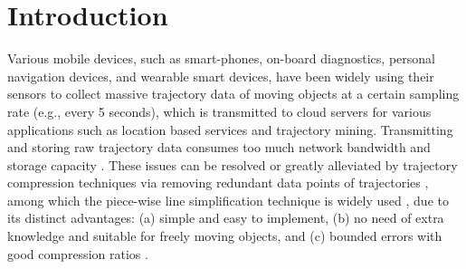 \section{Introduction}
\label{sec-intro}

Various mobile devices, such as smart-phones, on-board diagnostics, personal navigation devices, and wearable smart devices, have been widely using their sensors to collect massive trajectory data of moving objects at a certain sampling rate (e.g., every 5 seconds), which is transmitted to cloud servers for various applications such as location based services and trajectory mining.
%
Transmitting and storing raw trajectory data consumes too much network bandwidth and storage capacity \cite{Chen:Trajectory, Meratnia:Spatiotemporal, Liu:BQS, Muckell:Compression,Cao:Spatio, Popa:Spatio,Nibali:Trajic}. %
%
%
These issues can be resolved or greatly alleviated by trajectory compression techniques via removing redundant data points of trajectories \cite{Douglas:Peucker, Hershberger:Speeding, Meratnia:Spatiotemporal, Liu:BQS, Muckell:survey, Muckell:Compression, Chen:Trajectory, Cao:Spatio, Shi:Survey, Nibali:Trajic, Long:Direction, Popa:Spatio, Song:PRESS}, among which the piece-wise line {simplification} technique is widely used \cite{Douglas:Peucker, Meratnia:Spatiotemporal, Muckell:survey, Muckell:Compression, Chen:Trajectory, Cao:Spatio, Shi:Survey, Liu:BQS, Lin:Operb}, due to its distinct advantages: (a) simple and easy to implement, (b) no need of extra knowledge and suitable for freely  moving  objects, and (c) bounded errors with good compression ratios \cite{Popa:Spatio,Lin:Operb}.

